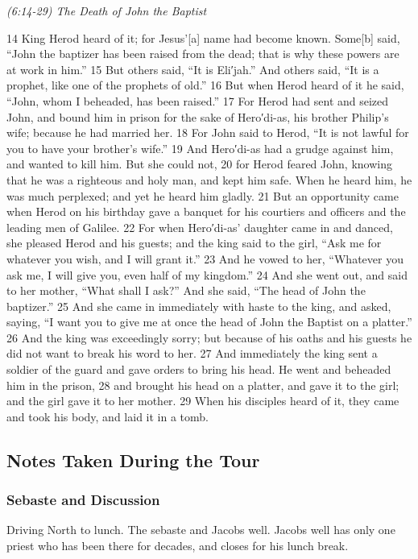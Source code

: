\documentclass[letterpaper]{report}
\begin{document}
{\centering
	\emph{(6:14-29) The Death of John the Baptist}\\
}
\begin{multicols}{2}
14 King Herod heard of it; for Jesus’[a] name had become known. Some[b] said, “John the baptizer has been raised from the dead; that is why these powers are at work in him.” 15 But others said, “It is Eli′jah.” And others said, “It is a prophet, like one of the prophets of old.” 16 But when Herod heard of it he said, “John, whom I beheaded, has been raised.” 17 For Herod had sent and seized John, and bound him in prison for the sake of Hero′di-as, his brother Philip’s wife; because he had married her. 18 For John said to Herod, “It is not lawful for you to have your brother’s wife.” 19 And Hero′di-as had a grudge against him, and wanted to kill him. But she could not, 20 for Herod feared John, knowing that he was a righteous and holy man, and kept him safe. When he heard him, he was much perplexed; and yet he heard him gladly. 21 But an opportunity came when Herod on his birthday gave a banquet for his courtiers and officers and the leading men of Galilee. 22 For when Hero′di-as’ daughter came in and danced, she pleased Herod and his guests; and the king said to the girl, “Ask me for whatever you wish, and I will grant it.” 23 And he vowed to her, “Whatever you ask me, I will give you, even half of my kingdom.” 24 And she went out, and said to her mother, “What shall I ask?” And she said, “The head of John the baptizer.” 25 And she came in immediately with haste to the king, and asked, saying, “I want you to give me at once the head of John the Baptist on a platter.” 26 And the king was exceedingly sorry; but because of his oaths and his guests he did not want to break his word to her. 27 And immediately the king sent a soldier of the guard and gave orders to bring his head. He went and beheaded him in the prison, 28 and brought his head on a platter, and gave it to the girl; and the girl gave it to her mother. 29 When his disciples heard of it, they came and took his body, and laid it in a tomb.
\end{multicols}

\subsection{Notes Taken During the Tour}
\subsubsection{Sebaste and Discussion}
Driving North to lunch.
The sebaste and Jacobs well. Jacobs well has only one priest who has been there for decades, and closes for his lunch break.
\end{document}
